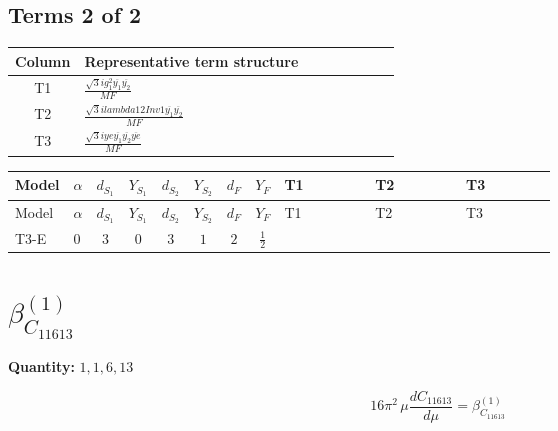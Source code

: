 \documentclass[8pt]{article}
\begin{document}
\begin{landscape}
\subsection*{Terms 2 of 2}
\begin{center}
\begin{tabular}{@{}c >{\raggedright\arraybackslash}p{0.82\linewidth}@{}}
\toprule
Column & Representative term structure \\
\midrule
T1 & \(\displaystyle \frac{\sqrt{3} i g_{1}^{2} \overline{y_{1}} \overline{y_{2}}}{MF}\) \\
\midrule
T2 & \(\displaystyle \frac{\sqrt{3} i lambda12Inv1 \overline{y_{1}} \overline{y_{2}}}{MF}\) \\
\midrule
T3 & \(\displaystyle \frac{\sqrt{3} i ye \overline{y_{1}} \overline{y_{2}} \overline{ye}}{MF}\) \\
\midrule
\bottomrule
\end{tabular}
\end{center}
\smallskip
\tiny
\begin{longtable}{@{}llcccccc >{\raggedright\arraybackslash}p{0.21\linewidth} >{\raggedright\arraybackslash}p{0.21\linewidth} >{\raggedright\arraybackslash}p{0.21\linewidth}@{}}
\toprule
Model & $\alpha$ & $d_{S_1}$ & $Y_{S_1}$ & $d_{S_2}$ & $Y_{S_2}$ & $d_F$ & $Y_F$ & T1 & T2 & T3 \\
\midrule
\endfirsthead
\toprule
Model & $\alpha$ & $d_{S_1}$ & $Y_{S_1}$ & $d_{S_2}$ & $Y_{S_2}$ & $d_F$ & $Y_F$ & T1 & T2 & T3 \\
\midrule
\endhead
T3-E & $0$ & $3$ & $0$ & $3$ & $1$ & $2$ & $\frac{1}{2}$ & \scriptsize\adjustbox{max width=\linewidth}{$\begin{gathered} - \frac{\sqrt{3} i g_{1}^{2} \overline{y_{1}} \overline{y_{2}}}{8 MF}\end{gathered}$} & \scriptsize\adjustbox{max width=\linewidth}{$\begin{gathered} \frac{\sqrt{3} i lambda12Inv1 \overline{y_{1}} \overline{y_{2}}}{6 MF}\end{gathered}$} & \scriptsize\adjustbox{max width=\linewidth}{$\begin{gathered} \frac{\sqrt{3} i ye \overline{y_{1}} \overline{y_{2}} \overline{ye}}{12 MF}\end{gathered}$} \\
\midrule
\bottomrule
\end{longtable}
\clearpage
\section*{$\beta_{C_{11613}}^{(1)}$}
\noindent\textbf{Quantity: }$\mathrm{1,1,6,13}$\par\smallskip
\[16\pi^2\,\mu\frac{d C_{11613}}{d\mu}=\beta_{C_{11613}}^{(1)}\]

\end{landscape}
\end{document}
